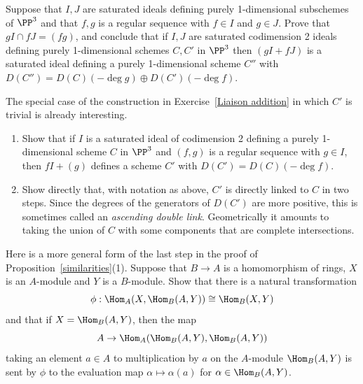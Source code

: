 \begin{exercise}
\label{Liaison addition}
Suppose that $I, J$ are saturated ideals defining purely 1-dimensional
%
subschemes of $\PP^3$
and that $f,g$ is a regular sequence with $f\in I$ and $g\in J$.
Prove that $g I \cap fJ = (fg)$, and conclude that if $I,J$ are saturated
codimension 2 ideals
defining purely 1-dimensional schemes $C,C'$ in $\PP^3$
then $(gI+fJ)$ is a saturated ideal defining a purely 1-dimensional
scheme $C''$ with $D(C'') = D(C)(-\!\deg g) \oplus D(C')(-\!\deg f)$.
\end{exercise}

\begin{exercise}\label{Basic double links}
The special case of the construction in Exercise~\ref{Liaison addition}
%
in which $C'$ is trivial is already interesting.

\begin{enumerate}
\item Show that if $I$ is a 
saturated ideal of codimension 2
%
defining a purely 1-dimensional scheme $C$ in $\PP^3$
and $(f, g)$ is a regular sequence with $g\in I$,
then $fI+(g)$ defines a scheme $C'$ with $D(C') = D(C)(-\!\deg f)$.

\item Show directly that, with notation as above, $C'$ is directly
linked to $C$
in two steps. Since the degrees of the generators of $D(C')$ are more
positive, this
is sometimes called an \emph{ascending double link}. Geometrically it
amounts to taking the
union of $C$ with some	components that are 
complete intersections.
%
\end{enumerate}
\end{exercise}

\begin{exercise}
\label{adjointness}
Here is a more general form of the last step in the proof of 
Proposition~\ref{similarities}(1). 
Suppose that $B\to A$ is a homomorphism
of rings, $X$ is an $A$-module and $Y$ is a
$B$-module. Show that there is a natural transformation
$$
\phi: \Hom_A(X, \Hom_B(A, Y)) \cong \Hom_B(X,Y)
$$
and that if $X = \Hom_B(A,Y)$, then the map
$$
A\to \Hom_A(\Hom_B(A,Y), \Hom_B(A, Y))
$$
taking an element $a\in A$ to multiplication by $a$ on the $A$-module
$\Hom_B(A, Y)$
is sent by $\phi$ to the evaluation map $\alpha \mapsto \alpha(a)$ for
$\alpha \in \Hom_B(A,Y)$.
\end{exercise}

